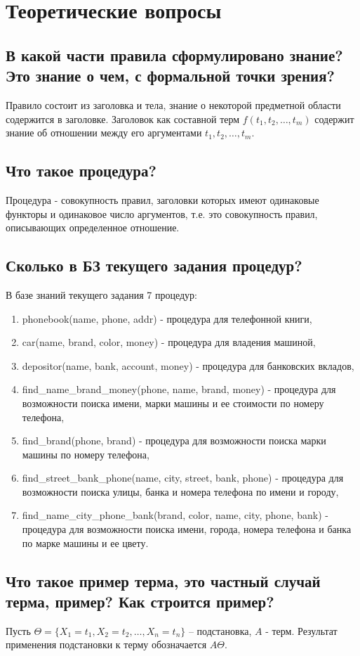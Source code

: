 \documentclass[a4paper,12pt]{article}
\begin{document}
\section*{Теоретические вопросы}
	
\subsection*{В какой части правила сформулировано знание? Это знание о чем, с формальной точки зрения?}
Правило состоит из заголовка и тела, знание о некоторой предметной области содержится в заголовке. Заголовок как составной терм  $f(t_1, t_2, \dots,t_m)$ содержит знание об отношении между его аргументами $t_1, t_2, \dots ,t_m$.
\subsection*{Что такое процедура?}
Процедура - совокупность правил, заголовки которых имеют одинаковые функторы и одинаковое число аргументов, т.е. это совокупность правил, описывающих определенное отношение.
\subsection*{Сколько в БЗ текущего задания процедур?
}
В базе знаний текущего задания 7 процедур:
\begin{enumerate}
	\item phonebook(name, phone, addr) - процедура для телефонной книги,
	\item car(name, brand, color, money) - процедура для владения машиной,
	\item depositor(name, bank, account, money) - процедура для банковских вкладов,
	\item find\_name\_brand\_money(phone, name, brand, money) - процедура для возможности поиска имени, марки машины и ее стоимости по номеру телефона,
	\item find\_brand(phone, brand) - процедура для возможности поиска марки машины по номеру телефона,
	\item find\_street\_bank\_phone(name, city, street, bank, phone) - процедура для возможности поиска улицы, банка и номера телефона по имени и городу,
	\item find\_name\_city\_phone\_bank(brand, color, name, city, phone, bank) - процедура для возможности поиска имени, города, номера телефона и банка по марке машины и ее цвету.
\end{enumerate}
\subsection*{Что такое пример терма, это частный случай терма, пример? Как строится пример? }
Пусть $\Theta =  \{X_1 = t_1, X_2= t_2, \dots , X_n = t_n \}$   –   подстановка, $A$ - терм. Результат применения подстановки к терму обозначается $A\Theta$.
\end{document}
